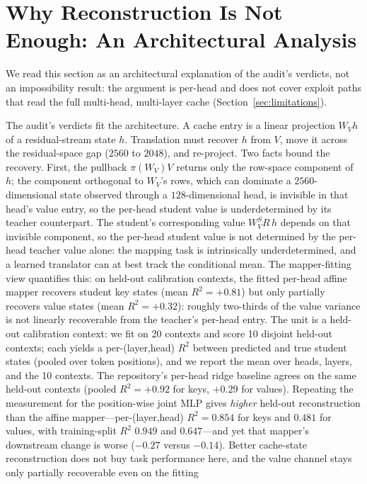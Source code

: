 \documentclass[10pt]{article}
\begin{document}
\section{Why Reconstruction Is Not Enough: An Architectural Analysis}
\label{sec:why}

We read this section as an architectural explanation of the audit's
verdicts, not an impossibility result: the argument is per-head and
does not cover exploit paths that read the full multi-head,
multi-layer cache (Section~\ref{sec:limitations}).

The audit's verdicts fit the architecture. A cache entry is a linear
projection $W_V h$ of a residual-stream state $h$. Translation must recover
$h$ from $V$, move it across the residual-space gap ($2560$ to $2048$), and
re-project. Two facts bound the recovery. First, the pullback
$\pi(W_V)V$ returns only the row-space component of $h$; the component
orthogonal to $W_V$'s rows, which can dominate a $2560$-dimensional state
observed through a $128$-dimensional head, is invisible in that head's value
entry, so the per-head student value is underdetermined by its teacher
counterpart. The
student's corresponding value $W_V^S R\, h$ depends on that invisible
component, so the per-head student value is not determined by the per-head teacher value alone: the mapping task is
intrinsically underdetermined, and a learned translator can at best track the
conditional mean. The mapper-fitting view quantifies this: on held-out
calibration contexts, the fitted per-head affine mapper recovers student key
states (mean $R^2 = +0.81$) but only partially recovers value states (mean
$R^2 = +0.32$): roughly two-thirds of the value variance is not linearly
recoverable from the teacher's per-head entry. The unit is a held-out
calibration context: we fit on 20 contexts and score 10 disjoint held-out
contexts; each yields a per-(layer,head) $R^2$ between predicted and true
student states (pooled over token positions), and we report the mean over
heads, layers, and the 10 contexts. The repository's per-head ridge baseline
agrees on the same held-out contexts (pooled $R^2 = +0.92$ for keys, $+0.29$
for values). Repeating the measurement for the position-wise joint MLP gives
\emph{higher} held-out reconstruction than the affine mapper---per-(layer,head)
$R^2 = 0.854$ for keys and $0.481$ for values, with training-split $R^2$ $0.949$
and $0.647$---and yet that mapper's downstream change is worse ($-0.27$ versus
$-0.14$). Better cache-state reconstruction does not buy task performance here,
and the value channel stays only partially recoverable even on the fitting
\end{document}
